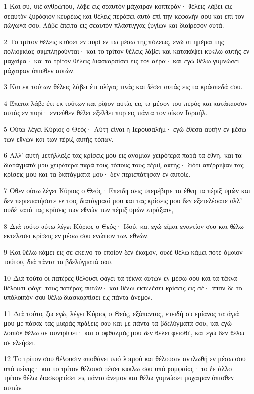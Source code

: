 \par 1 Και συ, υιέ ανθρώπου, λάβε εις σεαυτόν μάχαιραν κοπτεράν· θέλεις λάβει εις σεαυτόν ξυράφιον κουρέως και θέλεις περάσει αυτό επί την κεφαλήν σου και επί τον πώγωνά σου. Λάβε έπειτα εις σεαυτόν πλάστιγγας ζυγίων και διαίρεσον αυτά.
\par 2 Το τρίτον θέλεις καύσει εν πυρί εν τω μέσω της πόλεως, ενώ αι ημέραι της πολιορκίας συμπληρούνται· και το τρίτον θέλεις λάβει και κατακόψει κύκλω αυτής εν μαχαίρα· και το τρίτον θέλεις διασκορπίσει εις τον αέρα· και εγώ θέλω γυμνώσει μάχαιραν όπισθεν αυτών.
\par 3 Και εκ τούτων θέλεις λάβει έτι ολίγας τινάς και δέσει αυτάς εις τα κράσπεδά σου.
\par 4 Έπειτα λάβε έτι εκ τούτων και ρίψον αυτάς εις το μέσον του πυρός και κατάκαυσον αυτάς εν πυρί· εντεύθεν θέλει εξέλθει πυρ εις πάντα τον οίκον Ισραήλ.
\par 5 Ούτω λέγει Κύριος ο Θεός· Αύτη είναι η Ιερουσαλήμ· εγώ έθεσα αυτήν εν μέσω των εθνών και των πέριξ αυτής τόπων.
\par 6 Αλλ' αυτή μετήλλαξε τας κρίσεις μου εις ανομίαν χειρότερα παρά τα έθνη, και τα διατάγματά μου χειρότερα παρά τους τόπους τους πέριξ αυτής· διότι απέρριψαν τας κρίσεις μου και τα διατάγματά μου· δεν περιεπάτησαν εν αυτοίς.
\par 7 Όθεν ούτω λέγει Κύριος ο Θεός· Επειδή σεις υπερέβητε τα έθνη τα πέριξ υμών και δεν περιεπατήσατε εν τοις διατάγμασί μου και τας κρίσεις μου δεν εξετελέσατε αλλ' ουδέ κατά τας κρίσεις των εθνών των πέριξ υμών επράξατε,
\par 8 Διά τούτο ούτω λέγει Κύριος ο Θεός· Ιδού, και εγώ είμαι εναντίον σου και θέλω εκτελέσει κρίσεις εν μέσω σου ενώπιον των εθνών.
\par 9 Και θέλω κάμει εις σε εκείνο το οποίον δεν έκαμον, ουδέ θέλω κάμει ποτέ όμοιον τούτου, διά πάντα τα βδελύγματά σου.
\par 10 Διά τούτο οι πατέρες θέλουσι φάγει τα τέκνα αυτών εν μέσω σου και τα τέκνα θέλουσι φάγει τους πατέρας αυτών· και θέλω εκτελέσει κρίσεις εις σέ· άπαν δε το υπόλοιπόν σου θέλω διασκορπίσει εις πάντα άνεμον.
\par 11 Διά τούτο, ζω εγώ, λέγει Κύριος ο Θεός, εξάπαντος, επειδή συ εμίανας τα άγιά μου με πάσας τας μιαράς πράξεις σου και με πάντα τα βδελύγματά σου, και εγώ λοιπόν θέλω σε συντρίψει· και ο οφθαλμός μου δεν θέλει φεισθή, και εγώ δεν θέλω σε ελεήσει.
\par 12 Το τρίτον σου θέλουσιν αποθάνει υπό λοιμού και θέλουσιν αναλωθή εν μέσω σου υπό πείνης· και το τρίτον θέλουσι πέσει κύκλω σου υπό ρομφαίας· το δε άλλο τρίτον θέλω διασκορπίσει εις πάντα άνεμον και θέλω γυμνώσει μάχαιραν όπισθεν αυτών.

